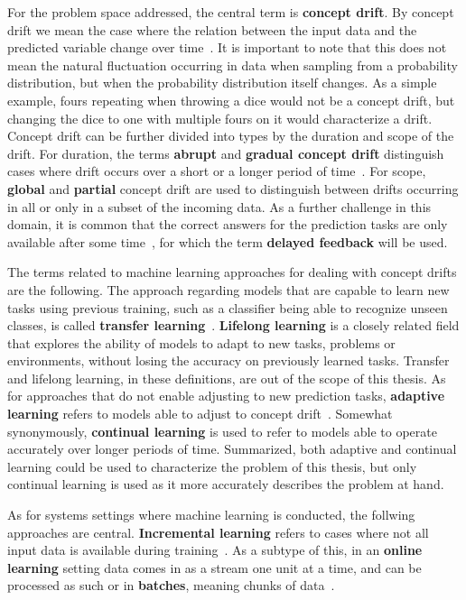 For the problem space addressed, the central term is \textbf{concept drift}. By concept drift we mean the case where the relation between the input
data and the predicted variable change over time~\cite{conceptdriftsurvey}. It is important to note that this does not mean the natural fluctuation occurring in data when sampling from a probability distribution, but when the probability distribution itself changes. As a simple example, fours repeating when throwing a dice would not be a concept drift, but changing the dice to one with multiple fours on it would characterize a drift. Concept drift can be further divided into types by the duration and scope of the drift. For duration, the terms \textbf{abrupt} and \textbf{gradual concept drift} distinguish cases where drift occurs over a short or a longer period of time~\cite{zliobaiteAdaptiveTrainingSet2010}. For scope, \textbf{global} and \textbf{partial} concept drift are used to distinguish between drifts occurring in all or only in a subset of the incoming data. As a further challenge in this domain, it is common that the correct answers for the prediction tasks are only available after some time~\cite{delayedlabelstreams}, for which the term  \textbf{delayed feedback} will be used. 

The terms related to machine learning approaches for dealing with concept drifts are the following. The approach regarding models that are capable to learn new tasks using previous training, such as a classifier being able to recognize unseen classes, is called \textbf{transfer learning}~\cite{iotsurvey}. \textbf{Lifelong learning} is a closely related field that explores the ability of models to adapt to new tasks, problems or environments, without losing the accuracy on previously learned tasks. Transfer and lifelong learning, in these definitions, are out of the scope of this thesis. As for approaches that do not enable adjusting to new prediction tasks, \textbf{adaptive learning} refers to models able to adjust to concept drift~\cite{conceptdriftsurvey}. Somewhat synonymously, \textbf{continual learning} is used to refer to models able to operate accurately over longer periods of time. Summarized, both adaptive and continual learning could be used to characterize the problem of this thesis, but only continual learning is used as it more accurately describes the problem at hand.

As for systems settings where machine learning is conducted, the follwing approaches are central. \textbf{Incremental learning} refers to cases where not all input data is available during training~\cite{giraud-carrierNoteUtilityIncremental2000}. As a subtype of this, in an \textbf{online learning} setting data comes in as a stream one unit at a time, and can be processed as such or in \textbf{batches}, meaning chunks of data~\cite{conceptdriftsurvey}.

